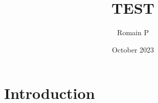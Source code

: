 \documentclass{article}
\title{TEST}
\author{Romain P}
\date{October 2023}
\begin{document}
\maketitle

\section{Introduction}
\end{document}
